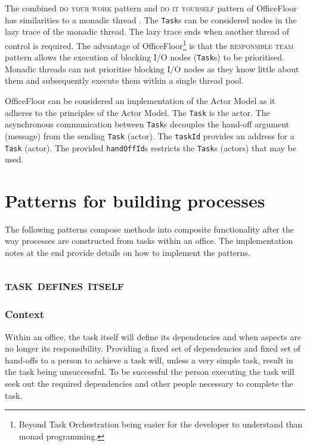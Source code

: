 \documentclass[prodmode]{style/acmlarge}
\begin{document}
The combined \textsc{do your work} pattern and \textsc{do it yourself} pattern
of OfficeFloor has similarities to a monadic thread \cite{monadic-thread}.  The
\texttt{Task}s can be considered nodes in the lazy trace of the monadic thread. 
The lazy trace ends when another thread of control is required.  The advantage of
OfficeFloor\footnote{Beyond Task Orchestration being easier for the developer to
understand than monad programming.} is that the \textsc{responsible team}
pattern allows the execution of blocking I/O nodes (\texttt{Task}s) to be
prioritised.  Monadic threads can not prioritise blocking I/O nodes as they know
little about them and subsequently execute them within a single thread pool.

OfficeFloor can be considered an implementation of the Actor Model \cite{actors}
as it adheres to the principles of the Actor Model.  The \texttt{Task} is the
actor.  The asynchronous communication between \texttt{Task}s decouples the
hand-off argument (message) from the sending \texttt{Task} (actor).  The
\texttt{taskId} provides an address for a \texttt{Task} (actor).  The provided
\texttt{handOffId}s restricts the \texttt{Task}s (actors) that may be used.




\section{Patterns for building processes}

The following patterns compose methods into composite functionality after the
way processes are constructed from tasks within an office.  The implementation
notes at the end provide details on how to implement the patterns.


\subsection{\textsc{\textbf{task defines itself}}}

\subsubsection*{Context} Within an office, the task itself will define its
dependencies and when aspects are no longer its responsibility.  Providing a
fixed set of dependencies and fixed set of hand-offs to a person to achieve a
task will, unless a very simple task, result in the task being unsuccessful.  To
be successful the person executing the task will seek out the required
dependencies and other people necessary to complete the task.
\end{document}
